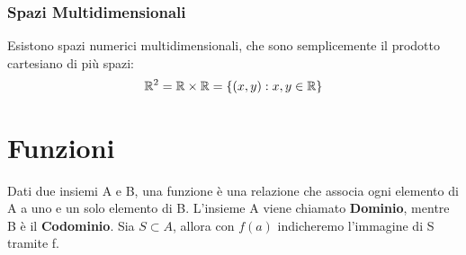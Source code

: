     \subsubsection*{Spazi Multidimensionali}
    Esistono spazi numerici multidimensionali, che sono semplicemente il prodotto cartesiano di più spazi:
    \[ \mathbb{R}^2 = \mathbb{R} \times \mathbb{R} = \{ (x,y):x,y\in \mathbb{R}\}\]

    \section*{Funzioni}
    Dati due insiemi A e B, una funzione è una relazione che associa ogni elemento di A a uno e
    un solo elemento di B. L'insieme A viene chiamato \textbf{Dominio}, mentre B è il \textbf{Codominio}.
    Sia $S \subset A$, allora con $f(a)$ indicheremo l'immagine di S tramite f.


